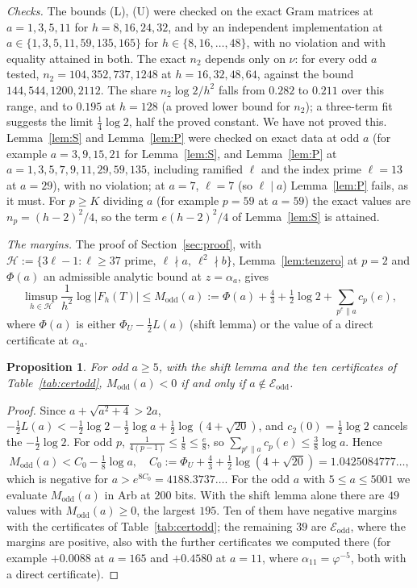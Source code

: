 \documentclass[11pt]{amsart}
\newtheorem{proposition}[theorem]{Proposition}
\theoremstyle{definition}
\theoremstyle{remark}
\numberwithin{equation}{section}
\newcommand{\cE}{\mathcal{E}}
\begin{document}
\emph{Checks.} The bounds (L), (U) were checked on the exact Gram matrices at $a=1,3,5,11$ for $h=8,16,24,32$, and by an
independent implementation at $a\in\{1,3,5,11,59,135,165\}$ for $h\in\{8,16,\dots,48\}$, with no violation and with
equality attained in both. The exact $n_2$ depends only on $\nu$: for every odd $a$ tested, $n_2=104,352,737,1248$ at
$h=16,32,48,64$, against the bound $144,544,1200,2112$. The share $n_2\log2/h^2$ falls from $0.282$ to $0.211$ over
this range, and to $0.195$ at $h=128$ (a proved lower bound for $n_2$); a three-term fit suggests the limit
$\frac14\log2$, half the proved constant. We have not proved this. Lemma~\ref{lem:S} and Lemma~\ref{lem:P} were checked
on exact data at odd $a$ (for example $a=3,9,15,21$ for Lemma~\ref{lem:S}, and Lemma~\ref{lem:P} at $a=1,3,5,7,9,11,29,59,135$,
including ramified $\ell$ and the index prime $\ell=13$ at $a=29$), with no violation; at $a=7$, $\ell=7$ (so $\ell\mid a$)
Lemma~\ref{lem:P} fails, as it must. For $p\ge K$ dividing $a$ (for example $p=59$ at $a=59$) the exact values are
$n_p=(h-2)^2/4$, so the term $e(h-2)^2/4$ of Lemma~\ref{lem:S} is attained.

\emph{The margins.} The proof of Section~\ref{sec:proof}, with $\mathcal H:=\{3\ell-1:\ell\ge37\text{ prime},\ \ell\nmid
a,\ \ell^2\nmid b\}$, Lemma~\ref{lem:tenzero} at $p=2$ and $\Phi(a)$ an admissible analytic bound at $z=\alpha_a$, gives
\begin{equation}\label{eq:Modd}
  \limsup_{h\in\mathcal H}\frac1{h^2}\log|F_h(T)|\le M_{\mathrm{odd}}(a):=\Phi(a)+\tfrac43+\tfrac12\log2
  +\sum_{p^e\parallel a}c_p(e),
\end{equation}
where $\Phi(a)$ is either $\Phi_U-\frac12L(a)$ (shift lemma) or the value of a direct certificate at $\alpha_a$.

\begin{proposition}\label{prop:marginsodd}
For odd $a\ge5$, with the shift lemma and the ten certificates of Table~\ref{tab:certodd}, $M_{\mathrm{odd}}(a)<0$ if and
only if $a\notin\cE_{\mathrm{odd}}$.
\end{proposition}

\begin{proof}
Since $a+\sqrt{a^2+4}>2a$, $-\frac12L(a)<-\frac12\log2-\frac12\log a+\frac12\log(4+\sqrt{20})$, and $c_2(0)=\frac12\log2$
cancels the $-\frac12\log2$. For odd $p$, $\frac1{4(p-1)}\le\frac18\le\frac e8$, so $\sum_{p^e\parallel a}c_p(e)\le
\frac38\log a$. Hence
\[
  M_{\mathrm{odd}}(a)<C_0-\tfrac18\log a,\quad C_0:=\Phi_U+\tfrac43+\tfrac12\log(4+\sqrt{20})=1.0425084777\ldots,
\]
which is negative for $a>e^{8C_0}=4188.3737\ldots$. For the odd $a$ with $5\le a\le5001$ we evaluate $M_{\mathrm{odd}}(a)$
in Arb at $200$ bits. With the shift lemma alone there are $49$ values with $M_{\mathrm{odd}}(a)\ge0$, the largest $195$.
Ten of them have negative margins with the certificates of Table~\ref{tab:certodd}; the remaining $39$ are
$\cE_{\mathrm{odd}}$, where the margins are positive, also with the further certificates we computed there (for
example $+0.0088$ at $a=165$ and $+0.4580$ at $a=11$, where $\alpha_{11}=\varphi^{-5}$, both with a direct certificate).
\end{proof}
\end{document}
